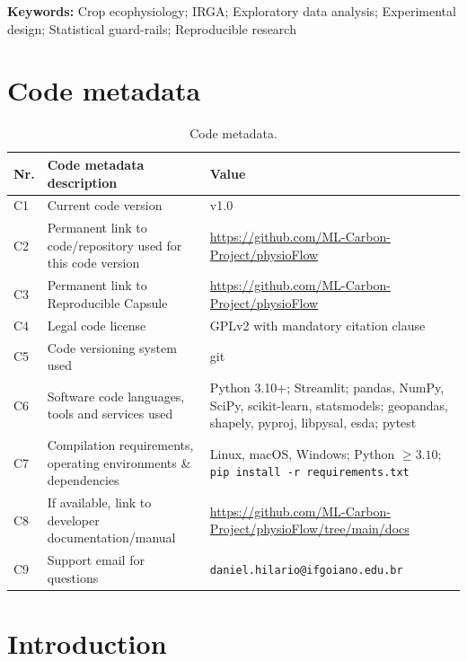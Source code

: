 \documentclass[11pt, letterpaper]{article}
\begin{document}
\vspace{0.5em}
\noindent\textbf{Keywords:} Crop ecophysiology; IRGA; Exploratory data analysis; Experimental design; Statistical guard-rails; Reproducible research
\vspace{0.5em}

\section*{Code metadata}

\begin{table}[htbp]
\centering
\footnotesize
\begin{tabular}{|l|p{4.7cm}|p{6.3cm}|}
\hline
\textbf{Nr.} & \textbf{Code metadata description} & \textbf{Value} \\
\hline
C1 & Current code version & v1.0 \\
\hline
C2 & Permanent link to code/repository used for this code version & \url{https://github.com/ML-Carbon-Project/physioFlow} \\
\hline
C3 & Permanent link to Reproducible Capsule & \url{https://github.com/ML-Carbon-Project/physioFlow} \\
\hline
C4 & Legal code license & GPLv2 with mandatory citation clause \\
\hline
C5 & Code versioning system used & git \\
\hline
C6 & Software code languages, tools and services used & Python 3.10+; Streamlit; pandas, NumPy, SciPy, scikit-learn, statsmodels; geopandas, shapely, pyproj, libpysal, esda; pytest \\
\hline
C7 & Compilation requirements, operating environments \& dependencies & Linux, macOS, Windows; Python $\geq 3.10$; \texttt{pip install -r requirements.txt} \\
\hline
C8 & If available, link to developer documentation/manual & \url{https://github.com/ML-Carbon-Project/physioFlow/tree/main/docs} \\
\hline
C9 & Support email for questions & \texttt{daniel.hilario@ifgoiano.edu.br} \\
\hline
\end{tabular}
\caption{Code metadata.}
\label{tbl:metadata}
\end{table}

\section{Introduction}\label{sec:intro}
\end{document}
